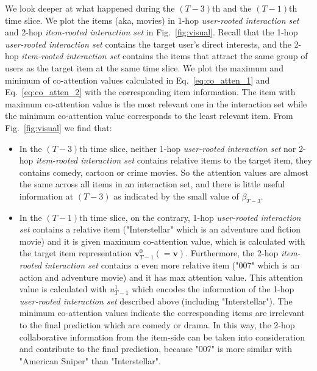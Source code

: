 We look deeper at what happened during the $(T-3)$th and the $(T-1)$th time slice.
We plot the items (aka, movies) in 1-hop \textit{user-rooted interaction set} and 2-hop \textit{item-rooted interaction set} in Fig.~\ref{fig:visual}. 
Recall that the 1-hop \textit{user-rooted interaction set} contains the target user's direct interests, and the 2-hop \textit{item-rooted interaction set} contains the items that attract the same group of users as the target item at the same time slice. We plot the maximum and minimum of co-attention values calculated in Eq.~\ref{eq:co_atten_1} and Eq.~\ref{eq:co_atten_2} with the corresponding item information. The item with maximum co-attention value is the most relevant one in the interaction set while the minimum co-attention value corresponds to the least relevant item.
From Fig.~\ref{fig:visual} we find that: 
\begin{itemize}[leftmargin=15pt]
	\item In the $(T-3)$th time slice, neither 1-hop \textit{user-rooted interaction set} nor 2-hop \textit{item-rooted interaction set} contains relative items to the target item, they contains comedy, cartoon or crime movies. So the attention values are almost the same across all items in an interaction set, and there is little useful information at $(T-3)$ as indicated by the small value of $\beta_{T-3}$.
	\item In the $(T-1)$th time slice, on the contrary, 1-hop \textit{user-rooted interaction set} contains a relative item ("Interstellar" which is an adventure and fiction movie) and it is given maximum co-attention value, which is calculated with the target item representation $\bm{v}_{T-1}^0(=\bm{v})$. Furthermore, the 2-hop \textit{item-rooted interaction set} contains a even more relative item ("007" which is an action and adventure movie) and it has max attention value. This attention value is calculated with $u^1_{T-1}$ which encodes the information of the 1-hop \textit{user-rooted interaction set} described above (including "Interstellar"). The minimum co-attention values indicate the corresponding items are irrelevant to the final prediction which are comedy or drama.
	In this way, the 2-hop collaborative information from the item-side can be taken into consideration and contribute to the final prediction, because "007" is more similar with "American Sniper" than "Interstellar".
\end{itemize}
